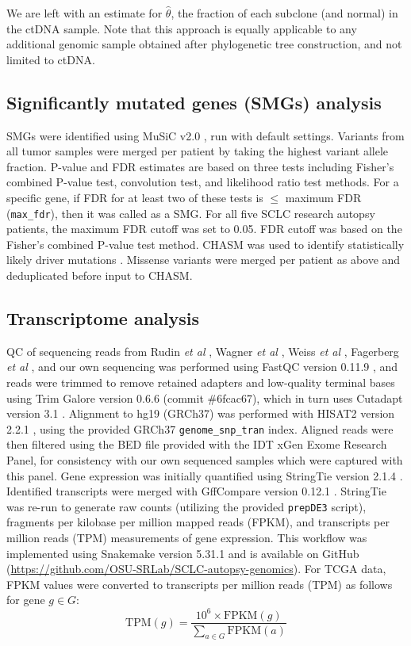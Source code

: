 We are left with an estimate for $\hat\theta$, the fraction of each subclone (and normal) in the ctDNA sample. Note that this approach is equally applicable to any additional genomic sample obtained after phylogenetic tree construction, and not limited to ctDNA\@.

\subsection[SMGs analysis]{Significantly mutated genes (SMGs) analysis}
SMGs were identified using MuSiC v2.0 \cite{dees2012}, run with default settings. Variants from all tumor samples were merged per patient by taking the highest variant allele fraction. P-value and FDR estimates are based on three tests including Fisher's combined P-value test, convolution test, and likelihood ratio test methods. For a specific gene, if FDR for at least two of these tests is $\le$ maximum FDR (\verb|max_fdr|), then it was called as a SMG\@. For all five SCLC research autopsy patients, the maximum FDR cutoff was set to 0.05. FDR cutoff was based on the Fisher's combined P-value test method. CHASM was used to identify statistically likely driver mutations \cite{carter2009}. Missense variants were merged per patient as above and deduplicated before input to CHASM\@.

\subsection{Transcriptome analysis}
QC of sequencing reads from Rudin \textit{et al} \cite{rudin2012}, Wagner \textit{et al} \cite{wagner2018}, Weiss \textit{et al} \cite{weiss2017}, Fagerberg \textit{et al} \cite{fagerberg2014}, and our own sequencing was performed using FastQC version 0.11.9 \cite{fastqc}, and reads were trimmed to remove retained adapters and low-quality terminal bases using Trim Galore version 0.6.6 (commit \#6fcac67), which in turn uses Cutadapt version 3.1 \cite{martin2011}. Alignment to hg19 (GRCh37) was performed with HISAT2 version 2.2.1 \cite{kim2019}, using the provided GRCh37 \texttt{genome\_snp\_tran} index. Aligned reads were then filtered using the BED file provided with the IDT xGen Exome Research Panel, for consistency with our own sequenced samples which were captured with this panel. Gene expression was initially quantified using StringTie version 2.1.4 \cite{kovaka2019}. Identified transcripts were merged with GffCompare version 0.12.1 \cite{pertea2020}. StringTie was re-run to generate raw counts (utilizing the provided \texttt{prepDE3} script), fragments per kilobase per million mapped reads (FPKM), and transcripts per million reads (TPM) measurements of gene expression. This workflow was implemented using Snakemake version 5.31.1 \cite{koster2012} and is available on GitHub (\url{https://github.com/OSU-SRLab/SCLC-autopsy-genomics}). For TCGA data, FPKM values were converted to transcripts per million reads (TPM) as follows for gene $g \in G$:
\begin{equation}
	\text{TPM}(g) = \frac{10^6 \times \text{FPKM}(g)}{\displaystyle\sum_{a \in G} \text{FPKM}(a)}
\end{equation}

